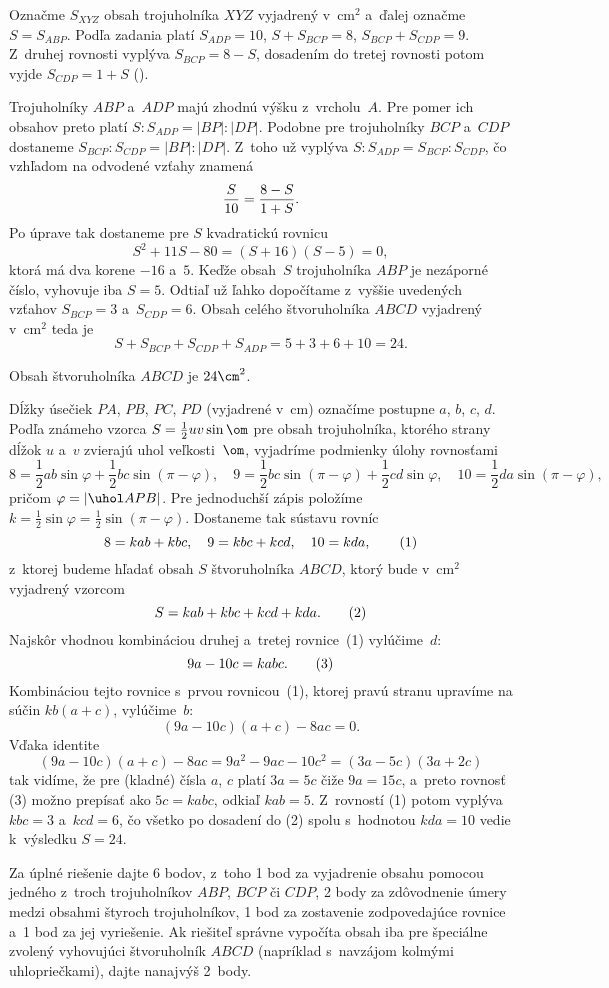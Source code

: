 {%
Označme $S_{XYZ}$ obsah trojuholníka $XYZ$ vyjadrený v~cm$^2$ a~ďalej označme
$S=S_{ABP}$.
Podľa zadania platí $S_{ADP}=10$, $S+S_{BCP}=8$, $S_{BCP}+S_{CDP}=9$.
Z~druhej rovnosti vyplýva $S_{BCP}=8-S$, dosadením do tretej rovnosti potom vyjde
$S_{CDP}=1+S$ (\obr).
%

Trojuholníky $ABP$ a~$ADP$ majú zhodnú výšku z~vrcholu~$A$. Pre pomer ich obsahov
preto platí
${S:S_{ADP}}={|BP|:|DP|}$. Podobne pre trojuholníky $BCP$ a~$CDP$ dostaneme
$S_{BCP}:S_{CDP}=|BP|:|DP|$.
Z~toho už vyplýva $S:S_{ADP}=S_{BCP}:S_{CDP}$,
čo vzhľadom na odvodené vzťahy znamená
$$
{S\over10}={8-S\over1+S}.
$$
Po úprave tak dostaneme pre $S$ kvadratickú rovnicu
$$
S^2+11S-80=(S+16)(S-5)=0,
$$
ktorá má dva korene $-16$ a~$5$. Keďže obsah~$S$ trojuholníka $ABP$ je
nezáporné číslo, vyhovuje iba $S=5$. Odtiaľ už ľahko dopočítame z~vyššie uvedených
vzťahov $S_{BCP}=3$ a~$S_{CDP}=6$. Obsah celého štvoruholníka $ABCD$ vyjadrený v~cm$^2$
teda je
$$
S+S_{BCP}+S_{CDP}+S_{ADP}=5+3+6+10=24.
$$

\zaver
Obsah štvoruholníka $ABCD$ je $24\cm^2$.

\ineriesenie
Dĺžky úsečiek $PA$, $PB$, $PC$,
$PD$ (vyjadrené v~cm) označíme postupne $a$, $b$, $c$, $d$.
Podľa známeho vzorca
$S=\frac12uv\sin\om$ pre obsah trojuholníka, ktorého strany dĺžok $u$ a~$v$
zvierajú uhol veľkosti~$\om$, vyjadríme podmienky úlohy rovnosťami
$$
8=\frac12{ab\sin\varphi}+\frac12{bc\sin(\pi-\varphi)},\quad
9=\frac12{bc\sin(\pi-\varphi)}+\frac12{cd\sin\varphi},\quad
10=\frac12{da\sin(\pi-\varphi)},
$$
pričom $\varphi=|\uhol APB|$. Pre jednoduchší zápis položíme
$k=\frac12\sin\varphi=\frac12\sin(\pi-\varphi)$. Dostaneme tak
sústavu rovníc
$$
8=kab+kbc,\quad 9=kbc+kcd,\quad10=kda,
\tag1
$$
z~ktorej budeme hľadať obsah $S$ štvoruholníka $ABCD$, ktorý bude
v~$\text{cm}^2$ vyjadrený vzorcom
$$
S=kab+kbc+kcd+kda.
\tag2
$$
Najskôr vhodnou kombináciou druhej a~tretej rovnice~(1) vylúčime~$d$:
$$
9a-10c=kabc.
\tag3
$$
Kombináciou tejto rovnice s~prvou rovnicou~(1), ktorej pravú
stranu upravíme na súčin $kb(a+c)$, vylúčime~$b$:
$$
(9a-10c)(a+c)-8ac=0.
$$
Vďaka identite
$$
(9a-10c)(a+c)-8ac=9a^2-9ac-10c^2=(3a-5c)(3a+2c)
$$
tak vidíme, že pre (kladné) čísla $a$, $c$ platí $3a=5c$
čiže $9a=15c$, a~preto rovnosť (3) možno prepísať ako $5c=kabc$,
odkiaľ $kab=5$. Z~rovností (1) potom vyplýva $kbc=3$ a~$kcd=6$,
čo všetko po dosadení do (2) spolu s~hodnotou $kda=10$
vedie k~výsledku $S=24$.

\nobreak\medskip\petit\noindent
Za úplné riešenie dajte 6 bodov, z~toho 1 bod za vyjadrenie obsahu pomocou jedného
z~troch trojuholníkov $ABP$, $BCP$ či $CDP$, 2 body za zdôvodnenie úmery medzi obsahmi štyroch
trojuholníkov, 1 bod za zostavenie zodpovedajúce rovnice a~1 bod za jej vyriešenie.
Ak riešiteľ správne vypočíta obsah iba pre špeciálne zvolený
vyhovujúci štvoruholník $ABCD$ (napríklad
s~navzájom kolmými uhlopriečkami), dajte nanajvýš 2~body.
\endpetit
\bigbreak
}

